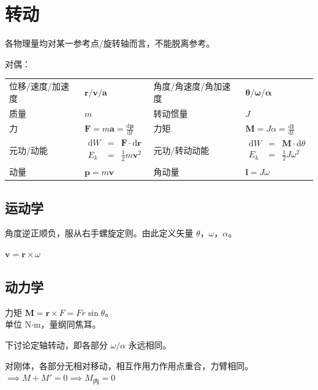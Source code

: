 \documentclass[12pt, a4paper, UTF8, openany]{ctexbook}
\newcommand{\dif}{\mathrm{d}}
\newcommand{\vect}[1]{\mathbf{#1}}
\newcommand{\vecr}{\vect{r}}
\newcommand{\vecv}{\vect{v}}
\newcommand{\veca}{\vect{a}}
\newcommand{\vecf}{\vect{F}}
\newcommand{\vecp}{\vect{p}}
\newcommand{\vecm}{\vect{M}}
\newcommand{\vecl}{\vect{l}}
\newcommand{\cross}{\times}
\begin{document}
    \section{转动}
    各物理量均对某一参考点/旋转轴而言，不能脱离参考。

    对偶：
    \begin{longtable}[h]{l l | l l}
        位移/速度/加速度 & $\vecr/\vecv/\veca$ & 
        角度/角速度/角加速度 & $\vect{\theta}/\vect{\omega}/\vect{\alpha}$ \\
        \addlinespace

        质量 & $m$ & 转动惯量 & $J$ \\
        \addlinespace

        力 & $\vecf = m \veca = \frac{\dif \vecp}{\dif t}$ & 
        力矩 & $\vecm = J \alpha = \frac{\dif \vecl}{\dif t}$ \\
        \addlinespace

        元功/动能 & $\begin{matrix} \dif W & = & \vecf\cdot\dif\vecr \\ E_k & = & \frac{1}{2}m \vecv^2 \end{matrix}$ & 
        元功/转动动能 & $\begin{matrix} \dif W & = & \vecm\cdot\dif\theta \\ E_k & = & \frac{1}{2}J\omega^2 \end{matrix}$ \\
        \addlinespace

        动量 & $\vecp = m \vecv$ & 角动量 & $\vecl = J \omega$
    \end{longtable}

        \subsection{运动学}
        角度逆正顺负，服从右手螺旋定则。由此定义矢量 $\theta$，$\omega$，$\alpha$。

        $\vecv = \vecr \cross \omega$

        \subsection{动力学}
        力矩 $\vecm = \vecr \cross F = Fr\sin\theta$。\\
        单位 N$\cdot$m，量纲同焦耳。

        下讨论定轴转动，即各部分 $\omega/\alpha$ 永远相同。

        对刚体，各部分无相对移动，相互作用力作用点重合，力臂相同。$\implies M + M' = 0 \implies M_{\text{内}} = 0$
\end{document}
